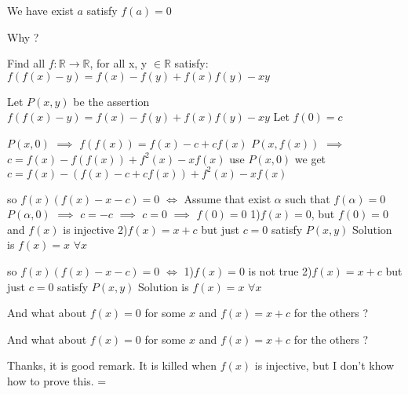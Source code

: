\begin{solution}
	\begin{tcolorbox}We have exist $a$ satisfy $f(a)=0$\end{tcolorbox}
Why ?
\end{solution}



\begin{solution}
	\begin{tcolorbox}Find all $f:\mathbb{R}\rightarrow \mathbb{R}$,  for all x, y $\in \mathbb{R}$ satisfy:
$f(f(x)-y)=f(x)-f(y)+f(x)f(y)-xy$\end{tcolorbox}

  
Let $ P(x,y) $ be the assertion $ f(f(x)-y)=f(x)-f(y)+f(x)f(y)-xy $
Let $ f(0)=c $

$ P(x,0) $ $ \implies $ $f(f(x))=f(x)-c+cf(x)$
$ P(x, f(x)) $ $ \implies$ $ c=f(x)-f(f(x))+f^2(x)-xf(x) $
use $ P(x,0) $ we get $c=f(x)-(f(x)-c+cf(x))+f^2(x)-xf(x)$ 

so $f(x)(f(x)-x-c)=0$ $\Leftrightarrow$
Assume that exist $\alpha$ such that $f(\alpha)=0$
$ P(\alpha,0) $ $ \implies$ $c=-c$ $ \implies$ $c=0$ $\implies$ $f(0)=0$
1)$f(x)=0$, but $f(0)=0$ and $f(x)$ is injective
2)$f(x)=x+c$ but just $c=0$ satisfy $ P(x,y) $
Solution is $ \boxed{f(x)=x} $ $ \forall x $
\end{solution}



\begin{solution}
	\begin{tcolorbox}
so $f(x)(f(x)-x-c)=0$ $\Leftrightarrow$
1)$f(x)=0$ is not true
2)$f(x)=x+c$ but just $c=0$ satisfy $ P(x,y) $
Solution is $ \boxed{f(x)=x} $ $ \forall x $\end{tcolorbox}
And what about $f(x)=0$ for some $x$ and $f(x)=x+c$ for the others ?
\end{solution}



\begin{solution}
	\begin{tcolorbox}And what about $f(x)=0$ for some $x$ and $f(x)=x+c$ for the others ?\end{tcolorbox}
Thanks, it is good remark. It is killed when $f(x)$ is injective, but I don't khow how to prove this. =\
\end{solution}



